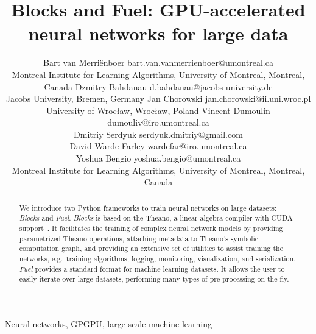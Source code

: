 \documentclass[twoside,11pt]{article}
\begin{document}
\title{Blocks and Fuel: GPU-accelerated neural networks for large data}

\author{\name Bart van Merri\"{e}nboer \email bart.van.vanmerrienboer@umontreal.ca \\
        \addr Montreal Institute for Learning Algorithms, University of Montreal, Montreal, Canada
        \AND
        \name Dzmitry Bahdanau \email d.bahdanau@jacobs-university.de \\
        \addr Jacobs University, Bremen, Germany
        \AND
        \name Jan Chorowski \email jan.chorowski@ii.uni.wroc.pl \\
        \addr University of Wroc\l aw, Wroc\l aw, Poland
        \AND
        \name Vincent Dumoulin \email dumouliv@iro.umontreal.ca \\
        \name Dmitriy Serdyuk \email serdyuk.dmitriy@gmail.com \\
        \name David Warde-Farley \email wardefar@iro.umontreal.ca \\
        \name Yoshua Bengio \email yoshua.bengio@umontreal.ca \\
        \addr Montreal Institute for Learning Algorithms, University of Montreal, Montreal, Canada}


\maketitle

\begin{abstract}%
  We introduce two Python frameworks to train neural networks on large
  datasets: \emph{Blocks} and \emph{Fuel}. \emph{Blocks} is based on the
  Theano, a linear algebra compiler with
  CUDA-support~\citep{Bastien-Theano-2012,bergstra+al:2010-scipy}. It
  facilitates the training of complex neural network models by providing
  parametrized Theano operations, attaching metadata to Theano's symbolic
  computation graph, and providing an extensive set of utilities to assist
  training the networks, e.g.\ training algorithms, logging, monitoring,
  visualization, and serialization. \emph{Fuel} provides a standard format for
  machine learning datasets. It allows the user to easily iterate over large
  datasets, performing many types of pre-processing on the fly.
\end{abstract}

\begin{keywords}
  Neural networks, GPGPU, large-scale machine learning
\end{keywords}
\end{document}
